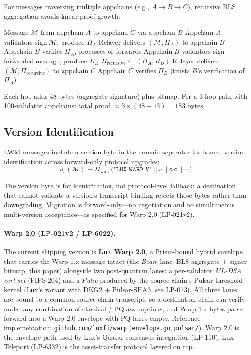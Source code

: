 For messages traversing multiple appchains (e.g., $A \to B \to C$), recursive BLS aggregation avoids linear proof growth:

\begin{algorithm}[H]
\caption{Multi-Hop Warp Relay}
\label{alg:multihop}
\begin{algorithmic}[1]
\Require Message $\mathcal{M}$ from appchain $A$ to appchain $C$ via appchain $B$
\State Appchain $A$ validators sign $\mathcal{M}$, produce $\Pi_A$
\State Relayer delivers $(\mathcal{M}, \Pi_A)$ to appchain $B$
\State Appchain $B$ verifies $\Pi_A$, processes or forwards
\State Appchain $B$ validators sign forwarded message, produce $\Pi_B$
\State $\Pi_{\text{recursive}} \gets (\Pi_A, \Pi_B)$ 
\State Relayer delivers $(\mathcal{M}, \Pi_{\text{recursive}})$ to appchain $C$
\State Appchain $C$ verifies $\Pi_B$ (trusts $B$'s verification of $\Pi_A$)
\end{algorithmic}
\end{algorithm}

Each hop adds 48 bytes (aggregate signature) plus bitmap. For a 3-hop path with 100-validator appchains: total proof $\approx 3 \times (48 + 13) = 183$ bytes.

\subsection{Version Identification}

LWM messages include a version byte in the domain separator for honest version identification across forward-only protocol upgrades:
\begin{equation}
    d_v(\mathcal{M}) = H_{\text{warp}}\bigl(\texttt{"LUX-WARP-V"} \| v \| \mathsf{src} \| \cdots\bigr)
\end{equation}

The version byte is for identification, not protocol-level fallback: a destination that cannot validate a version's transcript binding rejects those bytes rather than downgrading. Migration is forward-only---no negotiation and no simultaneous multi-version acceptance---as specified for Warp 2.0 (LP-021v2).

\paragraph{Warp 2.0 (LP-021v2 / LP-6022).}
The current shipping version is \textbf{Lux Warp 2.0}, a Prism-bound
hybrid envelope that carries the Warp 1.x message intact (the
\emph{Beam} lane: BLS aggregate + signer bitmap, this paper) alongside
two post-quantum lanes: a per-validator \emph{ML-DSA cert set}
(FIPS 204) and a \emph{Pulse} produced by the source chain's Pulsar
threshold kernel (Lux's variant with DKG2 + Pulsar-SHA3, see LP-073).
All three lanes are bound to a common source-chain transcript, so a
destination chain can verify under any combination of classical / PQ
assumptions, and Warp 1.x bytes parse forward into a Warp 2.0 envelope
with PQ lanes empty. Reference implementation:
\texttt{github.com/luxfi/warp} (\texttt{envelope.go}, \texttt{pulsar/}).
Warp 2.0 is the envelope path used by Lux's Quasar consensus
integration (LP-110); Lux Teleport (LP-6332) is the asset-transfer
protocol layered on top.

